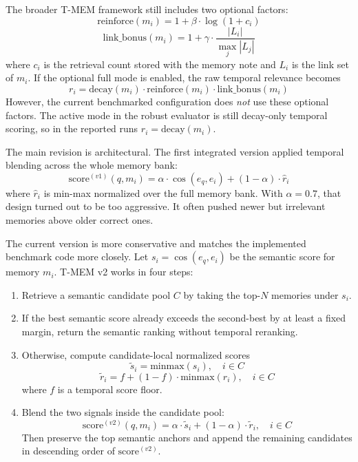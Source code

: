 \documentclass[conference]{IEEEtran}
\begin{document}
The broader T-MEM framework still includes two optional factors:
\begin{equation}
\text{reinforce}(m_i) = 1 + \beta \cdot \log(1 + c_i)
\end{equation}
\begin{equation}
\text{link\_bonus}(m_i) = 1 + \gamma \cdot \frac{|L_i|}{\max_j |L_j|}
\end{equation}
where $c_i$ is the retrieval count stored with the memory note and $L_i$ is the link set of $m_i$. If the optional full mode is enabled, the raw temporal relevance becomes
\begin{equation}
r_i = \text{decay}(m_i)\cdot \text{reinforce}(m_i)\cdot \text{link\_bonus}(m_i)
\end{equation}
However, the current benchmarked configuration does \emph{not} use these optional factors. The active mode in the robust evaluator is still decay-only temporal scoring, so in the reported runs $r_i = \text{decay}(m_i)$.

The main revision is architectural. The first integrated version applied temporal blending across the whole memory bank:
\begin{equation}
\text{score}^{(v1)}(q, m_i) = \alpha \cdot \cos(e_q, e_i) + (1 - \alpha)\cdot \hat{r}_i
\end{equation}
where $\hat{r}_i$ is min-max normalized over the full memory bank. With $\alpha = 0.7$, that design turned out to be too aggressive. It often pushed newer but irrelevant memories above older correct ones.

The current version is more conservative and matches the implemented benchmark code more closely. Let $s_i = \cos(e_q, e_i)$ be the semantic score for memory $m_i$. T-MEM v2 works in four steps:
\begin{enumerate}
    \item Retrieve a semantic candidate pool $C$ by taking the top-$N$ memories under $s_i$.
    \item If the best semantic score already exceeds the second-best by at least a fixed margin, return the semantic ranking without temporal reranking.
    \item Otherwise, compute candidate-local normalized scores
    \begin{equation}
    \tilde{s}_i = \text{minmax}(s_i), \quad i \in C
    \end{equation}
    \begin{equation}
    \tilde{r}_i = f + (1-f)\cdot \text{minmax}(r_i), \quad i \in C
    \end{equation}
    where $f$ is a temporal score floor.
    \item Blend the two signals inside the candidate pool:
    \begin{equation}
    \text{score}^{(v2)}(q, m_i) = \alpha \cdot \tilde{s}_i + (1-\alpha)\cdot \tilde{r}_i, \quad i \in C
    \end{equation}
    Then preserve the top semantic anchors and append the remaining candidates in descending order of $\text{score}^{(v2)}$.
\end{enumerate}
\end{document}
